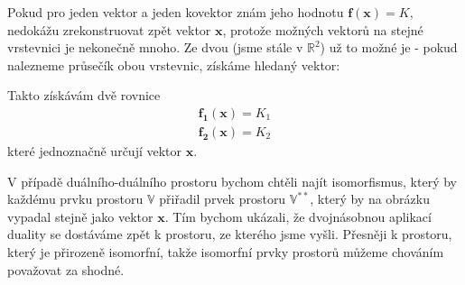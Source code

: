 \documentclass[a5paper,12pt]{amsbook}
\theoremstyle{definition}
\newcommand{\myvec}[1]{\mathbf{#1}}
\newcommand{\myspace}[1]{\mathbb{#1}}
\newcommand{\mydouble}[1]{\myspace{#1^{**}}}
\begin{document}
Pokud pro jeden vektor a jeden kovektor znám jeho hodnotu $\myvec{f(\myvec{x})} = K$, nedokážu zrekonstruovat
zpět vektor $\myvec{x}$, protože možných vektorů na stejné vrstevnici je nekonečně mnoho. Ze dvou (jsme stále
v $\mathbb{R}^2$) už to možné je - pokud nalezneme průsečík obou vrstevnic, získáme hledaný vektor:

\begin{center}

\end{center}

\noindent Takto získávám dvě rovnice
\begin{equation*}
\begin{split}
\myvec{f_1}(\myvec{x}) = K_1 \\
\myvec{f_2}(\myvec{x}) = K_2
\end{split}
\end{equation*}
které jednoznačně určují vektor $\myvec{x}$.

V případě duálního-duálního prostoru bychom chtěli najít isomorfismus, který by každému prvku prostoru
$\myspace{V}$ přiřadil prvek prostoru $\mydouble{V}$, který by na obrázku vypadal stejně jako vektor
$\myvec{x}$. Tím bychom ukázali, že dvojnásobnou aplikací duality se dostáváme zpět k prostoru,
ze kterého jsme vyšli. Přesněji k prostoru, který je přirozeně isomorfní, takže isomorfní prvky prostorů
můžeme chováním považovat za shodné.
\end{document}
